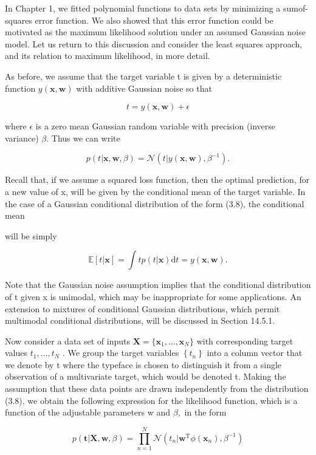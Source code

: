 \documentclass[
  10
]{article}
\begin{document}
In Chapter 1, we fitted polynomial functions to data sets by minimizing
a sumof-squares error function. We also showed that this error function
could be motivated as the maximum likelihood solution under an assumed
Gaussian noise model. Let us return to this discussion and consider the
least squares approach, and its relation to maximum likelihood, in more
detail.

As before, we assume that the target variable t is given by a
deterministic function \(y ( \mathbf { x } , \mathbf { w } )\) with
additive Gaussian noise so that

\[
t = y (\mathbf {x}, \mathbf {w}) + \epsilon\tag{3.7}
\]

where \(\epsilon\) is a zero mean Gaussian random variable with
precision (inverse variance) \(\beta .\) Thus we can write

\[
p (t | \mathbf {x}, \mathbf {w}, \beta) = \mathcal {N} (t | y (\mathbf {x}, \mathbf {w}), \beta^ {- 1}).\tag{3.8}
\]

Recall that, if we assume a squared loss function, then the optimal
prediction, for a new value of x, will be given by the conditional mean
of the target variable. In the case of a Gaussian conditional
distribution of the form (3.8), the conditional mean

will be simply

\[
\mathbb {E} [ t | \mathbf {x} ] = \int t p (t | \mathbf {x}) \mathrm{d} t = y (\mathbf {x}, \mathbf {w}).\tag{3.9}
\]

Note that the Gaussian noise assumption implies that the conditional
distribution of t given x is unimodal, which may be inappropriate for
some applications. An extension to mixtures of conditional Gaussian
distributions, which permit multimodal conditional distributions, will
be discussed in Section 14.5.1.

Now consider a data set of inputs
\(\mathbf { X } = \{ \mathbf { x } _ { 1 } , \ldots , \mathbf { x } _ { N } \}\)
with corresponding target values \(t _ { 1 } , \ldots , t _ { N }\) . We
group the target variables \(\left\{ t _ { n } \right\}\) into a column
vector that we denote by t where the typeface is chosen to distinguish
it from a single observation of a multivariate target, which would be
denoted t. Making the assumption that these data points are drawn
independently from the distribution (3.8), we obtain the following
expression for the likelihood function, which is a function of the
adjustable parameters w and \(\beta ,\) in the form

\[
p (\mathbf {t} | \mathbf {X}, \mathbf {w}, \beta) = \prod_ {n = 1} ^ {N} \mathcal {N} (t _ {n} | \mathbf {w} ^ {\mathrm{T}} \phi (\mathbf {x} _ {n}), \beta^ {- 1})\tag{3.10}
\]
\end{document}
